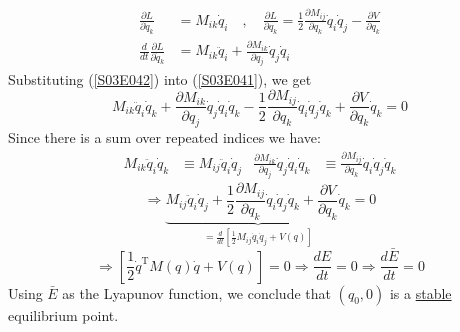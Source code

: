\documentclass[twoside,10pt,a4paper]{article}
\begin{document}
\begin{equation}\label{S03E042}
	\begin{aligned}
		\frac{\partial L}{\partial \dot{q}_k} &= M_{ik}\dot{q}_i \quad , \quad \frac{\partial L}{\partial q_k} = \frac{1}{2} \frac{\partial M_{ij}}{\partial q_k}\dot{q}_i\dot{q}_j - \frac{\partial V}{\partial q_k} \\
		\frac{d}{dt} \frac{\partial L}{\partial \dot{q}_k} &= M_{ik}\ddot{q}_i + \frac{\partial M_{ik}}{\partial q_j}\dot{q}_j\dot{q}_i
	\end{aligned}
\end{equation}
Substituting (\ref{S03E042}) into (\ref{S03E041}), we get
\begin{equation*}
	M_{ik} \ddot{q}_i\dot{q}_k + \frac{\partial M_{ik}}{\partial q_j}\dot{q}_j\dot{q}_i\dot{q}_k - \frac{1}{2}\frac{\partial M_{ij}}{\partial q_k}\dot{q}_i\dot{q}_j\dot{q}_k + \frac{\partial V}{\partial q_k}\dot{q}_k = 0
\end{equation*}
Since there is a sum over repeated indices we have:
\begin{align*}
	M_{ik}\ddot{q}_i\dot{q}_k &\equiv M_{ij}\ddot{q}_i\dot{q}_j & \frac{\partial M_{ik}}{\partial q_j}\dot{q}_j\dot{q}_i\dot{q}_k &\equiv \frac{\partial M_{ij}}{\partial q_k}\dot{q}_i\dot{q}_j\dot{q}_k
\end{align*}
\begin{equation}
	\Longrightarrow \underbrace{M_{ij}\ddot{q}_i\dot{q}_j + \frac{1}{2} \frac{\partial M_{ij}}{\partial q_k}\dot{q}_i\dot{q}_j\dot{q}_k + \frac{\partial V}{\partial q_k}\dot{q}_k}_{ \displaystyle =\frac{d}{dt}\left[ \frac{1}{2}M_{ij}\dot{q}_i\dot{q}_j+V(q) \right]} = 0
\end{equation}
\begin{equation*}
	\Longrightarrow \left[ \frac{1}{2}\dot{q}^\text{T}M(q)\dot{q} + V(q) \right] = 0 \Longrightarrow \frac{dE}{dt}=0 \Longrightarrow \frac{d\bar{E}}{dt}=0
\end{equation*}
Using $\bar{E}$ as the Lyapunov function, we conclude that $(q_0,0)$ is a \underline{stable} equilibrium point.
\end{document}
